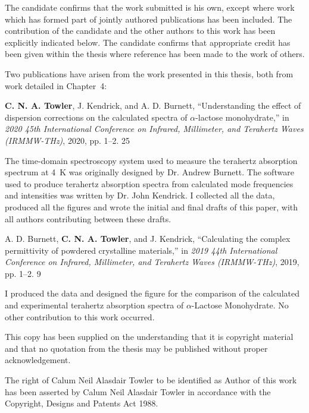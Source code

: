 The candidate confirms that the work submitted is his own, except where work which has formed part of jointly authored publications has been included. The contribution of the candidate and the other authors to this work has been explicitly indicated below. The candidate confirms that appropriate credit has been given within the thesis where reference has been made to the work of others.

Two publications have arisen from the work presented in this thesis, both from work detailed in Chapter~4:

\textbf{C. N. A. Towler}, J. Kendrick, and A. D. Burnett, “Understanding the effect of dispersion corrections on the calculated spectra of \(\alpha\)\nobreakdash-lactose monohydrate,” in \textit{2020 45th International Conference on Infrared, Millimeter, and Terahertz Waves (IRMMW\nobreakdash-THz)}, 2020, pp. 1\nobreakdash–2. 25

\vspace{0.1cm}

The time\nobreakdash-domain spectroscopy system used to measure the terahertz absorption spectrum at \SI{4}{K} was originally designed by Dr. Andrew Burnett. The software used to produce terahertz absorption spectra from calculated mode frequencies and intensities was written by Dr. John Kendrick. I collected all the data, produced all the figures and wrote the initial and final drafts of this paper, with all authors contributing between these drafts.

\vspace{0.7cm}

A. D. Burnett, \textbf{C. N. A. Towler}, and J. Kendrick, “Calculating the complex permittivity of powdered crystalline materials,” in \textit{2019 44th International Conference on Infrared, Millimeter, and Terahertz Waves (IRMMW\nobreakdash-THz)}, 2019, pp. 1–2. 9

\vspace{0.1cm}

I produced the data and designed the figure for the comparison of the calculated and experimental terahertz absorption spectra of \(\alpha\)\nobreakdash-Lactose Monohydrate. No other contribution to this work occurred.

This copy has been supplied on the understanding that it is copyright material and that no quotation from the thesis may be published without proper acknowledgement.

The right of Calum Neil Alasdair Towler to be identified as Author of this work has been asserted by Calum Neil Alasdair Towler in accordance with the Copyright, Designs and Patents Act 1988.


